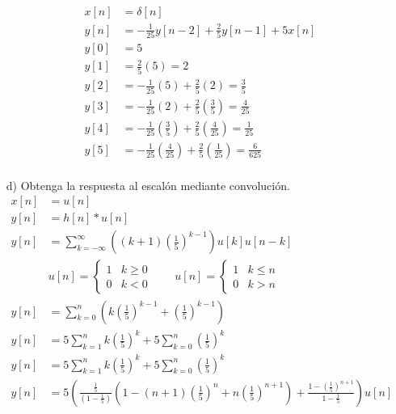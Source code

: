 \documentclass[a4paper,12pt]{article}
\begin{document}
\begin{itemize}
        \[ \begin{split}
            x[n] &= \delta[n]\\
            y[n] &= -\frac{1}{25}y[n-2] + \frac{2}{5}y[n-1] + 5x[n]\\
            y[0] &= 5\\
            y[1] &= \frac{2}{5}(5) = 2 \\
            y[2] &= -\frac{1}{25}(5) + \frac{2}{5}(2) = \frac{3}{5}\\
            y[3] &= -\frac{1}{25}\left(2\right) + \frac{2}{5}\left(\frac{3}{5}\right) = \frac{4}{25} \\
            y[4] &= -\frac{1}{25}\left(\frac{3}{5}\right) + \frac{2}{5}\left(\frac{4}{25}\right) = \frac{1}{25} \\
            y[5] &= -\frac{1}{25}\left(\frac{4}{25}\right) + \frac{2}{5}\left(\frac{1}{25}\right) = \frac{6}{625} \\
        \end{split} \]
    \item[d)] Obtenga la respuesta al escalón mediante convolución.
        \[ \begin{split}
            x[n] &= u[n] \\
            y[n] &= h[n] \ast u[n] \\
            y[n] &= \sum_{k=-\infty}^{\infty}\left((k + 1)\left(\frac{1}{5}\right)^{k-1}\right)u[k]u[n - k] \\&
            u[n] =\begin{cases}
                 1 & k \geq 0 \\
                 0 & k < 0
                 \end{cases} \qquad
            u[n] =\begin{cases}
                 1 & k \leq n \\
                 0 & k > n
                 \end{cases} \\
            y[n] &= \sum_{k=0}^{n}\left(k\left(\frac{1}{5}\right)^{k-1} +  \left(\frac{1}{5}\right)^{k-1}\right) \\
            y[n] &= 5\sum_{k=1}^{n}k\left(\frac{1}{5}\right)^k + 5\sum_{k=0}^{n}\left(\frac{1}{5}\right)^k \\
            y[n] &= 5\sum_{k=1}^{n}k\left(\frac{1}{5}\right)^k + 5\sum_{k=0}^{n}\left(\frac{1}{5}\right)^k \\
            y[n] &= 5\left( \frac{\frac{1}{5}}{\left(1-\frac{1}{5}\right)} \left( 1 - (n+1)\left(\frac{1}{5}\right)^n + n\left(\frac{1}{5}\right)^{n + 1} \right) + \frac{1-\left(\frac{1}{5}\right)^{n + 1}}{1 - \frac{1}{5}} \right)u[n]
        \end{split} \]
\end{itemize}\newpage
\end{document}
